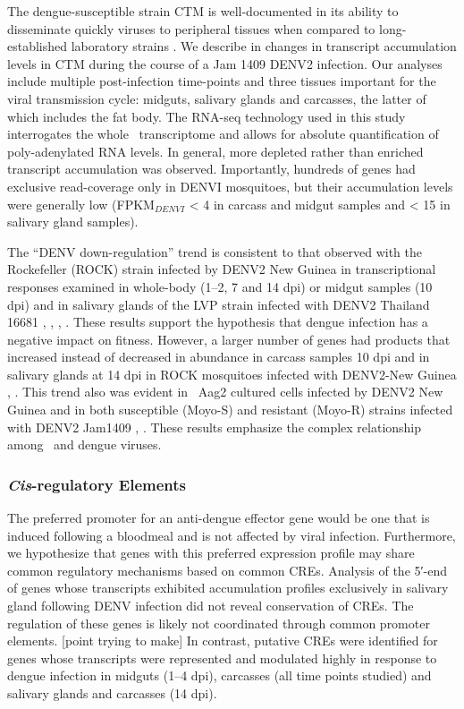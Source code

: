 The dengue-susceptible strain \gls{CTM} is well-documented in its ability to disseminate quickly viruses to peripheral tissues when compared to long-established laboratory strains \cite{Salazar2007}.
We describe in \citet{bonizzoni2012complex} changes in transcript accumulation levels in \gls{CTM} during the course of a Jam 1409 \gls{DENV}2 infection.
Our analyses include multiple post-infection time-points and three tissues important for the viral transmission cycle: midguts, salivary glands and carcasses, the latter of which includes the fat body.
The RNA-seq technology used in this study interrogates the whole \Aa\ transcriptome and allows for absolute quantification of poly-adenylated RNA levels.
In general, more depleted rather than enriched transcript accumulation was observed.
Importantly, hundreds of genes had exclusive read-coverage only in \gls{DENVI} mosquitoes, but their accumulation levels were generally low (FPKM$_{DENVI}$ < 4 in carcass and midgut samples and < 15 in salivary gland samples).

The “\gls{DENV} down-regulation” trend is consistent to that observed with the Rockefeller (ROCK) strain infected by \gls{DENV}2 New Guinea in transcriptional responses examined in whole-body (1–2, 7 and 14 \gls{dpi}) or midgut samples (10 \gls{dpi}) and in salivary glands of the LVP strain infected with \gls{DENV}2 Thailand 16681 \cite{Xi2008}, \cite{Luplertlop2011}, \cite{Sim2012}, \cite{Colpitts2011}.
These results support the hypothesis that dengue infection has a negative impact on fitness.
However, a larger number of genes had products that increased instead of decreased in abundance in carcass samples 10 \gls{dpi} and in salivary glands at 14 \gls{dpi} in ROCK mosquitoes infected with \gls{DENV}2-New Guinea \cite{Xi2008}, \cite{Sim2012}.
This trend also was evident in \Aa\ Aag2 cultured cells infected by \gls{DENV}2 New Guinea and in both susceptible (Moyo-S) and resistant (Moyo-R) strains infected with \gls{DENV}2 Jam1409 \cite{Sim2010}, \cite{Behura2011}.
These results emphasize the complex relationship among \Aa\ and dengue viruses.



\subsubsection{\textit{Cis}-regulatory Elements}

The preferred promoter for an anti-dengue effector gene would be one that is induced following a bloodmeal and is not affected by viral infection.
Furthermore, we hypothesize that genes with this preferred expression profile may share common regulatory mechanisms based on common \glspl{CRE}.
\alert{Analysis of the 5′-end of genes whose transcripts exhibited accumulation profiles exclusively in salivary gland following \gls{DENV} infection did not reveal conservation of \glspl{CRE}.
The regulation of these genes is likely not coordinated through common promoter elements. [point trying to make]}
In contrast, putative \glspl{CRE} were identified for genes whose transcripts were represented and modulated highly in response to dengue infection in midguts (1–4 \gls{dpi}), carcasses (all time points studied) and salivary glands and carcasses (14 \gls{dpi}).

